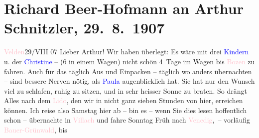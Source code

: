 

               \section[Richard Beer-Hofmann an Arthur Schnitzler, 29. 8. 1907]{ Richard Beer-Hofmann an Arthur Schnitzler, 29. 8. 1907}\nopagebreak{}\rehead{ }\normalsize\beginnumbering{} \toendnotes[C]{\smallbreak\pagebreak[2]} 
\toendnotes[C]{\smallbreak}\pstart
           \raggedleft{}{\pb}\textcolor{pink}{Velden}{}\ledrightnote{\textcolor{pink}{Velden}}{ }29/VIII 07\pend
           \pstart
           Lieber Arthur! Wir haben überlegt: Es wäre mit drei \textcolor{blue}{Kindern}{} u. der \textcolor{blue}{Christine}{}\ledrightnote{\textcolor{blue}{Christine}} – (6 in einem Wagen) nicht schön 4 Tage
               im Wagen bis \textcolor{pink}{Bozen}{}\ledrightnote{\textcolor{pink}{Bozen}} zu fahren. Auch für das täglich
               Aus und Einpacken – täglich wo anders übernachten – sind bessere Nerven nötig, als
                  \textcolor{blue}{Paula}{}\ledrightnote{\textcolor{blue}{Paula Beer-Hofmann}} augenblicklich hat. Sie hat nur den
               Wunsch viel zu schlafen, ruhig zu sitzen, und in sehr heisser Sonne zu braten. So
               drängt Alles nach dem \textcolor{pink}{Lido}{}\ledrightnote{\textcolor{pink}{Lido}}, den wir in nicht ganz
               sieben Stunden von hier, erreichen können.\pend
           \pstart
           {\pb}Ich reise also Samstag hier ab –
               bin es – wenn Sie dies lesen hoffentlich schon – übernachte in \textcolor{pink}{Villach}{}\ledrightnote{\textcolor{pink}{Villach}} und fahre Sonntag Früh nach \textcolor{pink}{Venedig}{}\ledrightnote{\textcolor{pink}{Venedig}}, – vorläufig \textcolor{pink}{Bauer-Grünwald}{}\ledrightnote{\textcolor{pink}{Grand Hotel Bauer-Grünwald}}, bis
